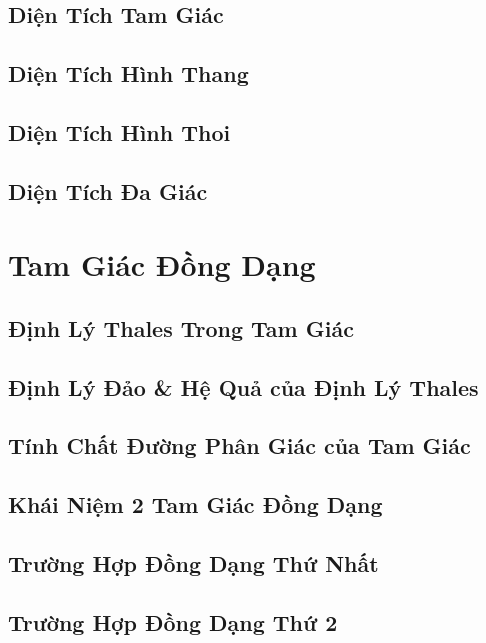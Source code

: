 \documentclass[oneside]{book}
\numberwithin{equation}{section}
\begin{document}
\section{Diện Tích Tam Giác}

\section{Diện Tích Hình Thang}

\section{Diện Tích Hình Thoi}

\section{Diện Tích Đa Giác}


\chapter{Tam Giác Đồng Dạng}

\section{Định Lý Thales Trong Tam Giác}

\section{Định Lý Đảo \& Hệ Quả của Định Lý Thales}

\section{Tính Chất Đường Phân Giác của Tam Giác}

\section{Khái Niệm 2 Tam Giác Đồng Dạng}

\section{Trường Hợp Đồng Dạng Thứ Nhất}

\section{Trường Hợp Đồng Dạng Thứ 2}
\end{document}
